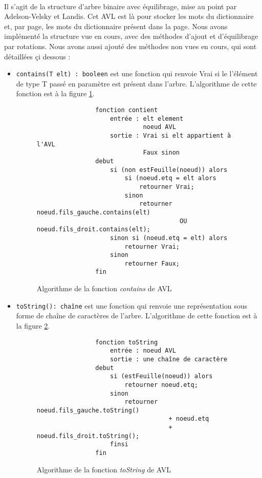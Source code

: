 \documentclass[a4paper]{article}
\begin{document}
		\paragraph{}{Il s'agit de la structure d'arbre binaire avec équilibrage, mise au point par Adelson-Velsky et Landis. Cet AVL est là pour stocker les mots du dictionnaire et, par page, les mots du dictionnaire présent dans la page. Nous avons implémenté la structure vue en cours, avec des méthodes d'ajout et d'équilibrage par rotations. Nous avons aussi ajouté des méthodes non vues en cours, qui sont détaillées çi dessous :}
		
		\begin{itemize}
			\item \verb|contains(T elt) : booleen| est une fonction qui renvoie Vrai si le l'élément de type T passé en paramètre est présent dans l'arbre. L'algorithme de cette fonction est à la figure \ref{algo_contains}.
			\begin{figure}
	    	    \begin{verbatim}
	    	    fonction contient
	    	        entrée : elt element
	    	                 noeud AVL
	    	        sortie : Vrai si elt appartient à l'AVL
	    	                 Faux sinon
	    	    debut
	    	        si (non estFeuille(noeud)) alors
	    	            si (noeud.etq = elt alors
	    	                retourner Vrai;
	    	            sinon
	    	                retourner noeud.fils_gauche.contains(elt) 
	    	                           OU noeud.fils_droit.contains(elt);
	    	        sinon si (noeud.etq = elt) alors
	    	            retourner Vrai;
	    	        sinon
	    	            retourner Faux;
	    	    fin
	    	    \end{verbatim}
	    	    \caption{Algorithme de la fonction \textit{contains} de AVL \label{algo_contains} }
	    	\end{figure}
			\item \verb|toString(): chaîne| est une fonction qui renvoie une représentation sous forme de chaîne de caractères de l'arbre. L'algorithme de cette fonction est à la figure \ref{algo_toString_avl}.
			
			\begin{figure}
	    	    \begin{verbatim}
	    	    fonction toString
	    	        entrée : noeud AVL
	    	        sortie : une chaîne de caractère
	    	    debut
	    	        si (estFeuille(noeud)) alors
	    	            retourner noeud.etq;
	    	        sinon
	    	            retourner noeud.fils_gauche.toString() 
	    	                        + noeud.etq 
	    	                        + noeud.fils_droit.toString();
	    	        finsi
	    	    fin
	    	    \end{verbatim}
	    	    \caption{Algorithme de la fonction \textit{toString} de AVL \label{algo_toString_avl} }
	    	\end{figure}
	    	

\end{itemize}
\end{document}
